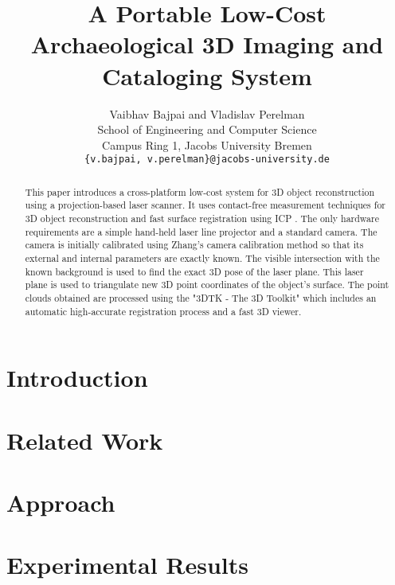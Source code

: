 \documentclass[conference]{IEEEtran}
\begin{document}
\title{A Portable Low-Cost Archaeological 3D Imaging and Cataloging System}

\author{
  Vaibhav Bajpai and Vladislav Perelman \\
  School of Engineering and Computer Science\\
  Campus Ring 1, Jacobs University Bremen\\
  \texttt{\{v.bajpai, v.perelman\}@jacobs-university.de}
}

\maketitle

\begin{abstract} This paper introduces a cross-platform low-cost system for 3D
  object reconstruction using a projection-based laser scanner. It uses
  contact-free measurement techniques for 3D object reconstruction and fast
  surface registration using \ac{ICP} \cite{besl:1992}. The only hardware
  requirements are a simple hand-held laser line projector and a standard
  camera. The camera is initially calibrated using Zhang's camera calibration
  method so that its external and internal parameters are exactly known. The
  visible intersection with the known background is used to find the exact 3D
  pose of the laser plane. This laser plane is used to triangulate new 3D
  point coordinates of the object's surface. The point clouds obtained are
  processed using the "3DTK - The 3D Toolkit" \cite{3dtk:2012} which includes
  an automatic high-accurate registration process and a fast 3D viewer.
\end{abstract}

\section{Introduction}
\label{section:introduction}


\section{Related Work}
\label{section:relatedwork}


\section{Approach}
\label{section:approach}


\section{Experimental Results}
\label{section:results}

\end{document}

